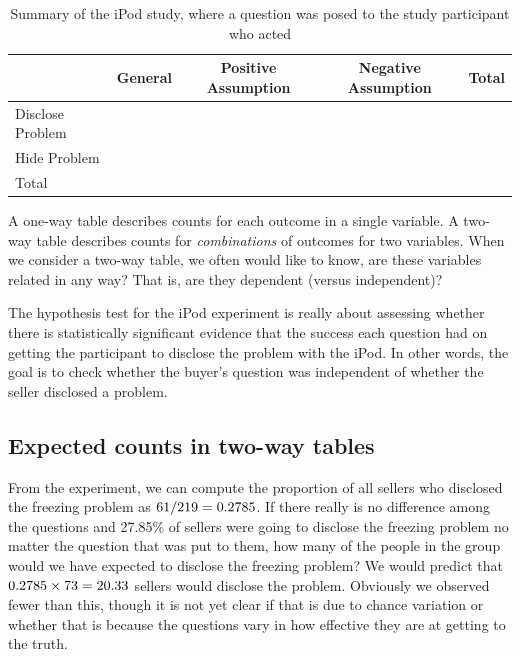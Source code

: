 \begin{table}[ht]
\centering
\begin{tabular}{l ccc l}
  \hline
  & General & Positive Assumption &
      Negative Assumption & Total \\ 
  \hline
  Disclose Problem & \iPodAA{} &  \iPodAB{} &
      \iPodAC{} & \iPodAD{} \\ 
  Hide Problem &  \iPodBA{} &  \iPodBB{} &
      \iPodBC{} & \iPodBD{} \\ 
  \hline
  Total & \iPodDA{} & \iPodDB{} &
      \iPodDC{} & \iPodDD{} \\
  \hline
\end{tabular}
\caption{Summary of the iPod study, where a question was
  posed to the study participant who acted}
\label{ipod_ask_data_summary}
\end{table}

\begin{termBox}{
  A one-way table describes counts for each outcome in a single
  variable.
  A two-way table describes counts for \emph{combinations}
  of outcomes for two variables.
  When we consider a two-way table, we often would like to know,
  are these variables related in any way?
  That is, are they dependent (versus independent)?}
\end{termBox}

The hypothesis test for the iPod experiment is really about
assessing whether there is statistically significant evidence
that the success each question had on getting the participant
to disclose the problem with the iPod.
In other words, the goal is to check whether the buyer's
question was independent of whether the seller disclosed
a problem.


\subsection{Expected counts in two-way tables}

\begin{example}{From the experiment,
    we can compute the proportion of all sellers who disclosed
    the freezing problem as $61{}/219 = 0.2785{}$.
    If there really is no difference among the questions
    and 27.85\% of sellers were going to disclose the freezing
    problem no matter the question that was put to them,
    how many of the \iPodDA{} people in the 
    group would we have expected to disclose the freezing
    problem?} \label{iPodExComputeExpAA}
  We would predict that $0.2785{} \times 73{} = 20.33{}$
  sellers would disclose the problem.
  Obviously we observed fewer than this, though it is not
  yet clear if that is due to chance variation or whether
  that is because the questions vary in how effective they
  are at getting to the truth.
\end{example}

